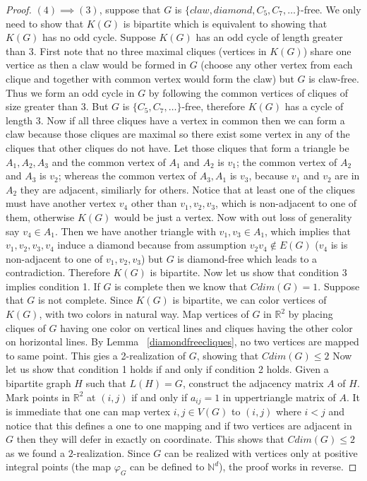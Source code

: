 \documentclass[12pt,a4paper,titlepage,openany]{report}
\begin{document}
\begin{proof}
$(4)\implies (3)$, suppose that $G$ is $\{claw, diamond, C_5, C_7, \ldots \}$-free. We only need to show that $K(G)$ is bipartite which is equivalent to showing that $K(G)$ has no odd cycle. Suppose $K(G)$ has an odd cycle of length greater than $3$. First note that no three  maximal cliques (vertices in $K(G)$) share one vertice as then a claw would be formed in $G$ (choose any other vertex from each clique and together with common vertex would form the claw) but $G$ is claw-free. Thus we form an odd cycle in $G$ by following the common vertices of cliques of size greater than $3$. But $G$ is $\{C_5,C_7,\ldots\}$-free, therefore $K(G)$ has a cycle of length $3$. Now if all three cliques have a vertex in common then we can form a claw because those cliques are maximal so there exist some vertex in any of the cliques that other cliques do not have. Let those cliques that form a triangle be $A_1,A_2,A_3$ and the common vertex of $A_1$ and $A_2$ is $v_1$; the common vertex of $A_2$ and $A_3$ is $v_2$; whereas the common vertex of $A_3,A_1$ is $v_3$, because $v_1$ and $v_2$ are in $A_2$ they are adjacent, similiarly for others. Notice that at least one of the cliques must have another vertex $v_4$ other than $v_1,v_2,v_3$, which is non-adjacent to one of them, otherwise $K(G)$ would be just a vertex. Now with out loss of generality say $v_4\in A_1$. Then we have another triangle with $v_1,v_3\in A_1$, which implies that $v_1,v_2,v_3,v_4$ induce a diamond because from assumption $v_2v_4\notin E(G)$ ($v_4$ is is non-adjacent to one of $v_1,v_2,v_3$) but $G$ is diamond-free which leads to a contradiction. Therefore $K(G)$ is bipartite.\newline 
Now let us show that condition 3 implies condition 1. If $G$ is complete then we know that $Cdim(G)=1$. Suppose that $G$ is not complete. Since $K(G)$ is bipartite, we can color vertices of $K(G)$, with two colors in natural way. Map vertices of $G$ in $\mathbb{R}^2$ by placing cliques of $G$ having one color on vertical lines and cliques having the other color on horizontal lines. By Lemma ~\ref{diamondfreecliques}, no two vertices are mapped to same point. This gies a 2-realization of $G$, showing that $Cdim(G)\leq 2$
\newline
Now let us show that condition 1 holds if and only if condition 2 holds. Given a bipartite graph $H$ such that $L(H)=G$, construct the adjacency matrix $A$ of $H$. Mark points in $\mathbb{R}^2$ at $(i, j)$ if and only if $a_{ij} = 1$ in uppertriangle matrix of $A$. It is immediate that one can map vertex ${i,j}\in V(G)$ to $(i,j)$ where $i<j$ and notice that this defines a one to one mapping and if two vertices are adjacent in $G$ then they will defer in exactly on coordinate. This shows that $Cdim(G)\leq 2$ as we found a $2$-realization.\newline
Since $G$ can be realized with vertices only at positive integral points (the map $\varphi_G$ can be defined to $\mathbb{N}^d$), the proof works in reverse.
\end{proof}
\end{document}
